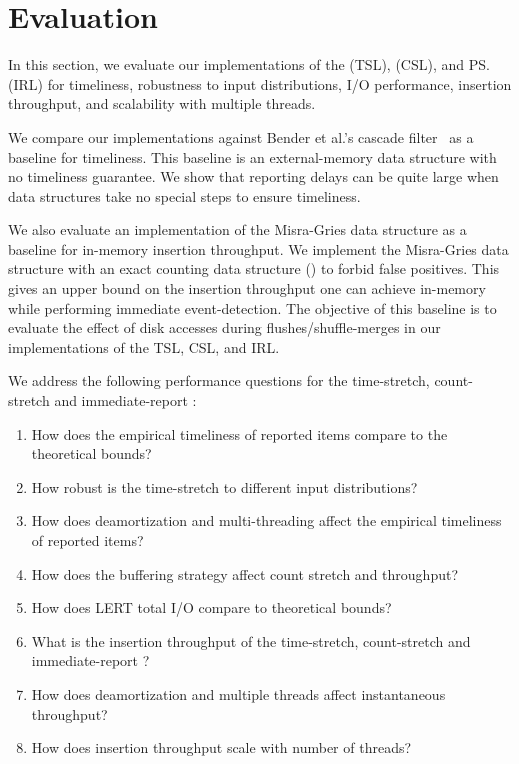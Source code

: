 

\section{Evaluation}

In this section, we evaluate our implementations of the \ts (TSL), \cs (CSL),
and \ps (IRL) for timeliness, robustness to input distributions, I/O
performance, insertion throughput, and scalability with multiple threads.

We compare our implementations against Bender et al.'s
cascade filter~\cite{BenderFaJo12} as a baseline for timeliness. 
%
This baseline is an external-memory
data structure with no timeliness guarantee.
We show that reporting delays can be quite large when data structures take no
special steps to ensure timeliness.


We also evaluate an implementation of the Misra-Gries
data structure as a baseline for in-memory insertion throughput. We implement
the Misra-Gries data structure with an exact counting data structure (\cqf) to forbid
false positives.
%
This gives an upper bound on the insertion throughput one can achieve in-memory
while performing immediate event-detection. The objective of this baseline is to
evaluate the effect of disk accesses during flushes/shuffle-merges in our
implementations of the TSL, CSL, and IRL.


We address the following performance questions for the time-stretch,
count-stretch and immediate-report \LERT:

\begin{enumerate}[noitemsep,nolistsep,leftmargin=*]
%
  \item How does the empirical timeliness of reported items compare to the
    theoretical bounds?
%
  \item How robust is the time-stretch \LERT to different input distributions?
%
  \item How does deamortization and multi-threading affect the empirical
    timeliness of reported items?
%
  \item How does the buffering strategy affect count stretch and throughput?
%
  \item How does LERT total I/O
compare to theoretical bounds?
%
  \item What is the insertion throughput of the time-stretch, count-stretch and
    immediate-report \LERT?
%
  \item How does deamortization and multiple threads affect instantaneous
    throughput?
%
  \item How does insertion throughput scale with number of threads?
%
\end{enumerate}

